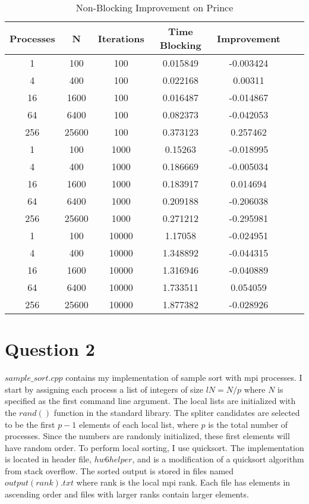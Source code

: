 \documentclass[10pt]{article}
\begin{document}
\begin{table}[h!]
\centering
\begin{tabular}{ |c|c|c|c|c|c|c| }
\hline
Processes&	N&	Iterations&	Time Blocking&	Improvement\\
\hline
1&	100&	100&	0.015849&	-0.003424\\
4&	400&	100&	0.022168&	0.00311\\
16&	1600&	100&	0.016487&	-0.014867\\
64&	6400&	100&	0.082373&	-0.042053\\
256&	25600&	100&	0.373123&	0.257462\\
1&	100&	1000&	0.15263&	-0.018995\\
4&	400&	1000&	0.186669&	-0.005034\\
16&	1600&	1000&	0.183917&	0.014694\\
64&	6400&	1000&	0.209188&	-0.206038\\
256&	25600&	1000&	0.271212&	-0.295981\\
1&	100&	10000&	1.17058&	-0.024951\\
4&	400&	10000&	1.348892&	-0.044315\\
16&	1600&	10000&	1.316946&	-0.040889\\
64&	6400&	10000&	1.733511&	0.054059\\
256&	25600&	10000&	1.877382&	-0.028926\\
\hline
\end{tabular}
 \caption{Non-Blocking Improvement on Prince}
 \label{tab1}
 \end{table}

\newpage

\section{Question 2}

$sample\_sort.cpp$ contains my implementation of sample sort with mpi processes. I start by assigning each process a list of integers of size  $lN = N/p$ where $N$ is specified as the first command line argument. The local lists are initialized with the $rand()$ function in the standard library. The spliter candidates are selected to be the first $p-1$ elements of each local list, where $p$ is the total number of processes. Since the numbers are randomly initialized, these first elements will have random order. To perform local sorting, I use quicksort. The implementation is located in header file, $hw6helper$, and is a modification of a quicksort algorithm from stack overflow. The sorted output is stored in files named $output(rank).txt$ where rank is the local mpi rank. Each file has elements in ascending order and files with larger ranks contain larger elements.\\
\end{document}
